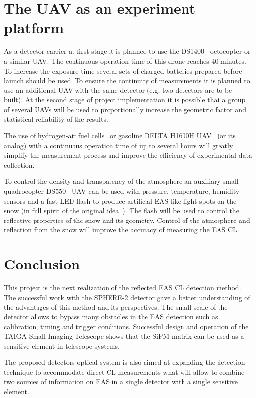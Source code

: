 \documentclass[a4paper,11pt]{article}
\begin{document}
\section{The UAV as an experiment platform}

As a detector carrier at first stage it is planned to use the DS1400~\cite{dronestroy} octocopter or a similar UAV.
The continuous operation time of this drone reaches 40 minutes.
To increase the exposure time several sets of charged batteries prepared before launch should be used. 
To ensure the continuity of measurements it is planned to use an additional UAV with the same detector (e.g. two detectors are to be built).
At the second stage of project implementation it is possible that a group of several UAVs will be used to proportionally increase the geometric factor and statistical reliability of the results. 

The use of hydrogen-air fuel cells~\cite{UAVair} or gasoline DELTA H1600H UAV~\cite{UAVoil} (or its analog) with a continuous operation time of up to several hours will greatly simplify the measurement process and improve the efficiency of experimental data collection.

To control the density and transparency of the atmosphere an auxiliary small quadrocopter DS550~\cite{dronestroy} UAV can be used with pressure, temperature, humidity sensors and a fast LED flash to produce artificial EAS-like light spots on the snow (in full spirit of the original idea~\cite{Chu74}).
The flash will be used to control the reflective properties of the snow and its geometry. Control of the atmosphere and reflection from the snow will improve the accuracy of measuring the EAS CL.

\section{Conclusion}

This project is the next realization of the reflected EAS CL detection method. The successful work with the SPHERE-2 detector gave a better understanding of the advantages of this method and its perspectives. The small scale of the detector allows to bypass many obstacles in the EAS detection such as calibration, timing and trigger conditions. Successful design and operation of the TAIGA Small Imaging Telescope shows that the SiPM matrix can be used as a sensitive element in telescope systems.

The proposed detectors optical system is also aimed at expanding the detection technique to accommodate direct CL measurements what will allow to combine two sources of information on EAS in a single detector with a single sensitive element.
\end{document}

